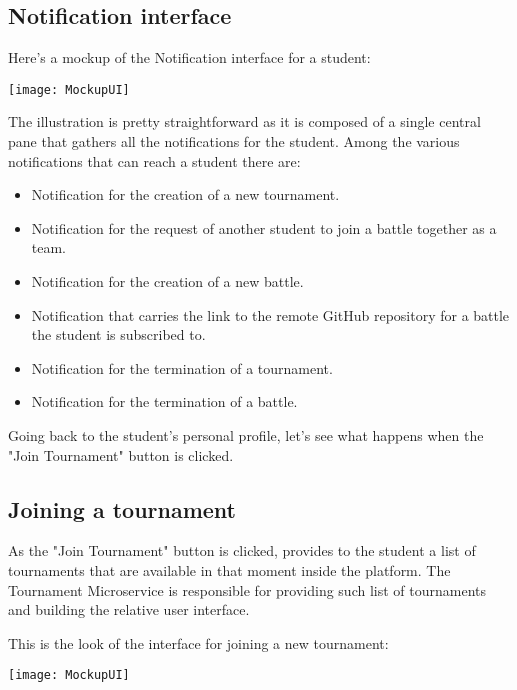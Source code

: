 \begin{minipage}{\linewidth}
\subsection{Notification interface}
Here's a mockup of the Notification interface for a student:

\begin{center}
	\texttt{[image: MockupUI]}
\end{center}

\end{minipage}

The illustration is pretty straightforward as it is composed of a single central pane that gathers all the notifications for the student. Among the various notifications that can reach a student there are:
\begin{itemize}
	\item Notification for the creation of a new tournament.
	\item Notification for the request of another student to join a battle together as a team.
	\item Notification for the creation of a new battle.
	\item Notification that carries the link to the remote GitHub repository for a battle the student is subscribed to.
	\item Notification for the termination of a tournament.
	\item Notification for the termination of a battle.
\end{itemize}

Going back to the student's personal profile, let's see what happens when the "Join Tournament" button is clicked. 


\begin{minipage}{\linewidth}

\subsection{Joining a tournament}
As the "Join Tournament" button is clicked, \app provides to the student a list of tournaments that are available in that moment inside the platform. The Tournament Microservice is responsible for providing such list of tournaments and building the relative user interface.

This is the look of the interface for joining a new tournament:

\begin{center}
	\texttt{[image: MockupUI]}
\end{center}

\end{minipage}

